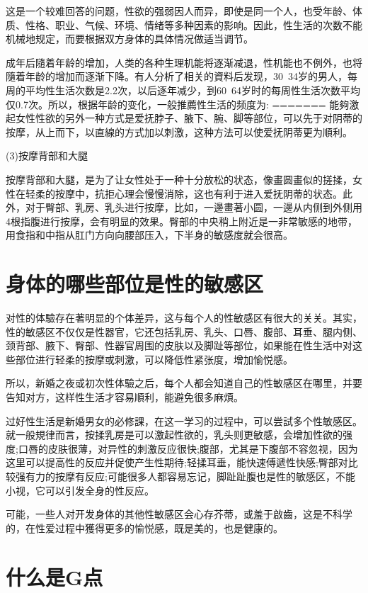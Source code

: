 \documentclass[12pt,UTF8]{ctexbook}
\begin{document}
这是一个较难回答的问题，性欲的强弱因人而异，即使是同一个人，也受年龄、体质、性格、职业、气候、环境、情绪等多种因素的影响。因此，性生活的次数不能机械地规定，而要根据双方身体的具体情况做适当调节。

成年后隨着年龄的增加，人类的各种生理机能将逐渐减退，性机能也不例外，也将隨着年龄的增加而逐渐下降。有人分析了相关的資料后发现，30~34岁的男人，每周的平均性生活次数是2.2次，以后逐年减少，到60~64岁时的每周性生活次数平均仅0.7次。所以，根据年龄的变化，一般推薦性生活的频度为:
=======
能夠激起女性性欲的另外一种方式是爱抚脖子、腋下、腕、脚等部位，可以先于对阴蒂的按摩，从上而下，以直線的方式加以刺激，这种方法可以使爱抚阴蒂更为順利。

(3)按摩背部和大腿

按摩背部和大腿，是为了让女性处于一种十分放松的状态，像畫圆畫似的搓揉，女性在轻柔的按摩中，抗拒心理会慢慢消除，这也有利于进入爱抚阴蒂的状态。此外，对于臀部、乳房、乳头进行按摩，比如，一邊畫著小圆，一邊从内侧到外侧用4根指腹进行按摩，会有明显的效果。臀部的中央稍上附近是一非常敏感的地带，用食指和中指从肛门方向向腰部压入，下半身的敏感度就会很高。

\section{身体的哪些部位是性的敏感区}

对性的体驗存在著明显的个体差异，这与每个人的性敏感区有很大的关关。其实，性的敏感区不仅仅是性器官，它还包括乳房、乳头、口唇、腹部、耳垂、腿内侧、颈背部、腋下、臀部、性器官周围的皮肤以及脚趾等部位，如果能在性生活中对这些部位进行轻柔的按摩或刺激，可以降低性紧张度，增加愉悦感。

所以，新婚之夜或初次性体驗之后，每个人都会知道自己的性敏感区在哪里，并要告知对方，这样性生活才容易順利，能避免很多麻煩。

过好性生活是新婚男女的必修課，在这一学习的过程中，可以尝試多个性敏感区。就一般規律而言，按揉乳房是可以激起性欲的，乳头则更敏感，会增加性欲的强度;口唇的皮肤很薄，对异性的刺激反应很快;腹部，尤其是下腹部不容忽视，因为这里可以提高性的反应并促使产生性期待;轻揉耳垂，能快速傅遞性快感;臀部对比较强有力的按摩有反应;可能很多人都容易忘记，脚趾趾腹也是性的敏感区，不能小视，它可以引发全身的性反应。

可能，一些人对开发身体的其他性敏感区会心存芥蒂，或羞于啟齒，这是不科学的，在性爱过程中獲得更多的愉悦感，既是美的，也是健康的。

\section{什么是G点}
\end{document}
